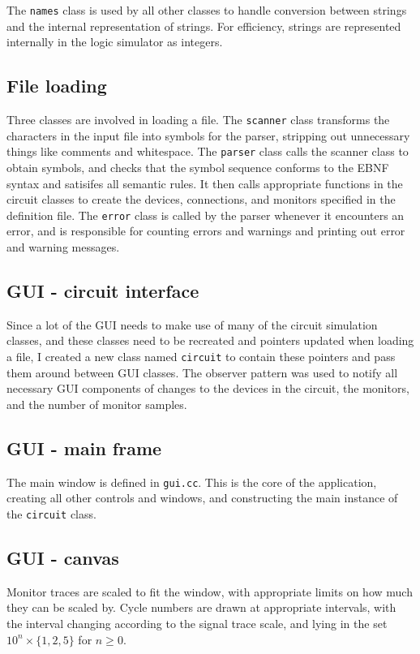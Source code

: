 \documentclass[a4paper,10pt]{article}
\begin{document}
The \texttt{names} class is used by all other classes to handle conversion between strings and the internal representation of strings. For efficiency, strings are represented internally in the logic simulator as integers. 

\subsection{File loading}
Three classes are involved in loading a file. The \texttt{scanner} class transforms the characters in the input file into symbols for the parser, stripping out unnecessary things like comments and whitespace. The \texttt{parser} class calls the scanner class to obtain symbols, and checks that the symbol sequence conforms to the EBNF syntax and satisifes all semantic rules. It then calls appropriate functions in the circuit classes to create the devices, connections, and monitors specified in the definition file. The \texttt{error} class is called by the parser whenever it encounters an error, and is responsible for counting errors and warnings and printing out error and warning messages. 

\subsection{GUI - circuit interface}
Since a lot of the GUI needs to make use of many of the circuit simulation classes, and these classes need to be recreated and pointers updated when loading a file, I created a new class named \texttt{circuit} to contain these pointers and pass them around between GUI classes. The observer pattern was used to notify all necessary GUI components of changes to the devices in the circuit, the monitors, and the number of monitor samples. 

\subsection{GUI - main frame}
The main window is defined in \texttt{gui.cc}. This is the core of the application, creating all other controls and windows, and constructing the main instance of the \texttt{circuit} class. 

\subsection{GUI - canvas}
Monitor traces are scaled to fit the window, with appropriate limits on how much they can be scaled by. Cycle numbers are drawn at appropriate intervals, with the interval changing according to the signal trace scale, and lying in the set $10^n \times \{1, 2, 5\}$ for $n \geq 0$.
\end{document}
